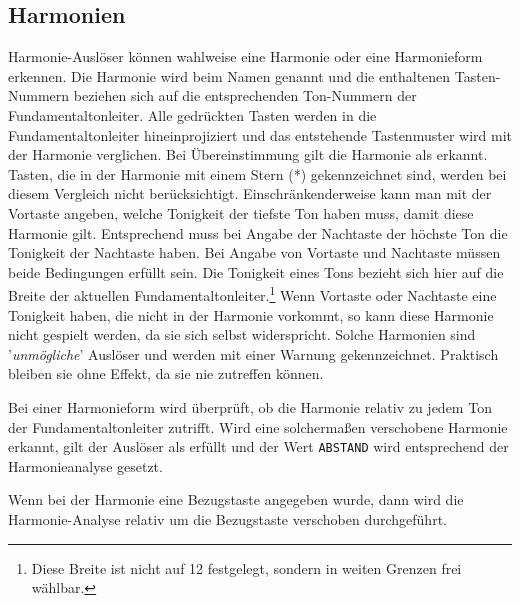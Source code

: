 \subsection{Harmonien}\label{sec:harmonien}
Harmonie-Auslöser
 können wahlweise eine Harmonie oder eine Harmonieform
erkennen. Die Harmonie wird beim Namen genannt und die enthaltenen
Tasten-Nummern beziehen sich auf die entsprechenden Ton-Nummern der
Fundamentaltonleiter.
Alle gedrückten Tasten werden in die
Fundamentaltonleiter hineinprojiziert und das entstehende Tastenmuster
wird mit der Harmonie verglichen. Bei Übereinstimmung gilt die
Harmonie als erkannt. Tasten, die in der Harmonie mit einem
Stern (*)\index{*} gekennzeichnet sind, werden bei diesem
Vergleich nicht berücksichtigt.
Einschränkenderweise kann man mit der Vortaste angeben,
welche Tonigkeit
der tiefste Ton haben muss, damit diese Harmonie gilt. Entsprechend muss
bei Angabe der Nachtaste der höchste Ton
die Tonigkeit der Nachtaste
haben. Bei Angabe von Vortaste und Nachtaste müssen beide Bedingungen
erfüllt sein. Die Tonigkeit eines Tons bezieht sich hier auf die Breite
der aktuellen Fundamentaltonleiter.\footnote{Diese Breite ist nicht
auf 12 festgelegt, sondern in weiten Grenzen frei wählbar.}
Wenn Vortaste oder Nachtaste eine Tonigkeit haben, die nicht in der
Harmonie vorkommt, so kann diese Harmonie nicht gespielt werden, da sie
sich selbst widerspricht. Solche Harmonien sind '\emph{unmögliche}'
Auslöser
 und werden mit einer Warnung gekennzeichnet. Praktisch
bleiben sie ohne Effekt, da sie nie zutreffen können.

Bei einer Harmonieform wird überprüft,
ob die Harmonie relativ zu jedem
Ton der Fundamentaltonleiter zutrifft. Wird eine solchermaßen
verschobene Harmonie erkannt, gilt der Auslöser als erfüllt
und der Wert \texttt{ABSTAND} wird entsprechend der Harmonieanalyse gesetzt.

Wenn bei der Harmonie eine Bezugstaste
 angegeben wurde, dann wird
die Harmonie-Analyse relativ um die Bezugstaste verschoben durchgeführt.

    

